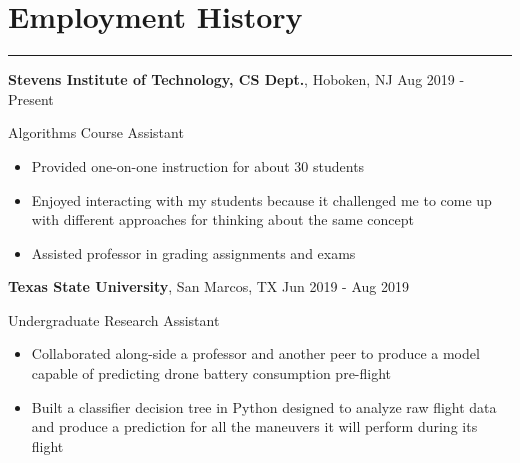 \documentclass[10pt]{article}
\newcommand{\resumesection}[1]{\vspace{-0.2cm}\section*{#1}\vspace{-0.2cm}\hrule\vspace{0.2cm}}
\begin{document}




\resumesection{Employment History}

\textbf{Stevens Institute of Technology, CS Dept.}, Hoboken, NJ \hfill Aug 2019 - Present\par
Algorithms Course Assistant
\begin{itemize}
	\item Provided one-on-one instruction for about 30 students 
	\item Enjoyed interacting with my students because it challenged me to come up with different approaches for thinking about the same concept
	\item Assisted professor in grading assignments and exams
\end{itemize}

\textbf{Texas State University}, San Marcos, TX \hfill Jun 2019 - Aug 2019\par
Undergraduate Research Assistant
\begin{itemize}
	\item Collaborated along-side a professor and another peer to produce a model capable of predicting drone battery consumption pre-flight
	\item Built a classifier decision tree in Python designed to analyze raw flight data and produce a prediction for all the maneuvers it will perform during its flight
\end{itemize}
\end{document}
